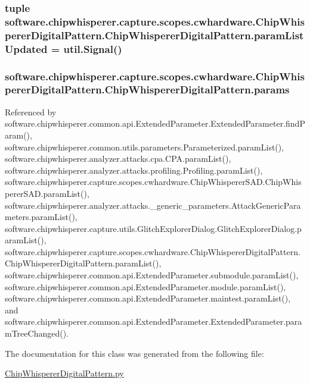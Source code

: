 \subsubsection[{param\+List\+Updated}]{\setlength{\rightskip}{0pt plus 5cm}tuple software.\+chipwhisperer.\+capture.\+scopes.\+cwhardware.\+Chip\+Whisperer\+Digital\+Pattern.\+Chip\+Whisperer\+Digital\+Pattern.\+param\+List\+Updated = util.\+Signal()\hspace{0.3cm}{\ttfamily [static]}}\label{classsoftware_1_1chipwhisperer_1_1capture_1_1scopes_1_1cwhardware_1_1ChipWhispererDigitalPattern_1_1ChipWhispererDigitalPattern_a5b896f5498ebe6624fe774289c201ccf}
\hypertarget{classsoftware_1_1chipwhisperer_1_1capture_1_1scopes_1_1cwhardware_1_1ChipWhispererDigitalPattern_1_1ChipWhispererDigitalPattern_a86a4d66129c4a7117a3542b71b2fe004}{}
\subsubsection[{params}]{\setlength{\rightskip}{0pt plus 5cm}software.\+chipwhisperer.\+capture.\+scopes.\+cwhardware.\+Chip\+Whisperer\+Digital\+Pattern.\+Chip\+Whisperer\+Digital\+Pattern.\+params}\label{classsoftware_1_1chipwhisperer_1_1capture_1_1scopes_1_1cwhardware_1_1ChipWhispererDigitalPattern_1_1ChipWhispererDigitalPattern_a86a4d66129c4a7117a3542b71b2fe004}


Referenced by software.\+chipwhisperer.\+common.\+api.\+Extended\+Parameter.\+Extended\+Parameter.\+find\+Param(), software.\+chipwhisperer.\+common.\+utils.\+parameters.\+Parameterized.\+param\+List(), software.\+chipwhisperer.\+analyzer.\+attacks.\+cpa.\+C\+P\+A.\+param\+List(), software.\+chipwhisperer.\+analyzer.\+attacks.\+profiling.\+Profiling.\+param\+List(), software.\+chipwhisperer.\+capture.\+scopes.\+cwhardware.\+Chip\+Whisperer\+S\+A\+D.\+Chip\+Whisperer\+S\+A\+D.\+param\+List(), software.\+chipwhisperer.\+analyzer.\+attacks.\+\_\+generic\+\_\+parameters.\+Attack\+Generic\+Parameters.\+param\+List(), software.\+chipwhisperer.\+capture.\+utils.\+Glitch\+Explorer\+Dialog.\+Glitch\+Explorer\+Dialog.\+param\+List(), software.\+chipwhisperer.\+capture.\+scopes.\+cwhardware.\+Chip\+Whisperer\+Digital\+Pattern.\+Chip\+Whisperer\+Digital\+Pattern.\+param\+List(), software.\+chipwhisperer.\+common.\+api.\+Extended\+Parameter.\+submodule.\+param\+List(), software.\+chipwhisperer.\+common.\+api.\+Extended\+Parameter.\+module.\+param\+List(), software.\+chipwhisperer.\+common.\+api.\+Extended\+Parameter.\+maintest.\+param\+List(), and software.\+chipwhisperer.\+common.\+api.\+Extended\+Parameter.\+Extended\+Parameter.\+param\+Tree\+Changed().



The documentation for this class was generated from the following file\+:\begin{DoxyCompactItemize}
\item 
\hyperlink{ChipWhispererDigitalPattern_8py}{Chip\+Whisperer\+Digital\+Pattern.\+py}\end{DoxyCompactItemize}
